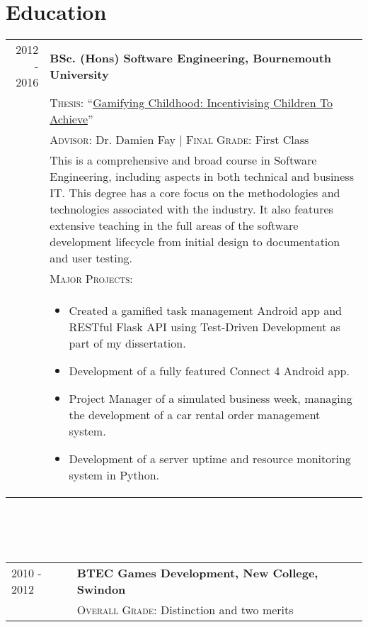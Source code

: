 \section{Education}
\begin{tabular}{r|p{11cm}}
	2012 - 2016 & \textbf{BSc. (Hons) Software Engineering, Bournemouth University}\\ 
	& \textsc{Thesis}: ``\href{https://github.com/mikeporterdev/Dissertation/blob/master/digitalmain.pdf}{Gamifying Childhood: Incentivising Children To Achieve}'' \\
	& \textsc{Advisor}: Dr. Damien Fay | \normalsize \textsc{Final Grade}: First Class \\
	& \footnotesize This is a comprehensive and broad course in Software Engineering, including aspects in both technical and business IT. This degree has a core focus on the methodologies and technologies associated with the industry. It also features extensive teaching in the full areas of the software development lifecycle from initial design to documentation and user testing. \\
	& \vspace{1pt} \textsc{Major Projects}: \\
	& \vspace{-0.9em}\begin{itemize}[itemsep=0pt,topsep=0pt,leftmargin=*]\footnotesize
	\item Created a gamified task management Android app and RESTful Flask API using Test-Driven Development as part of my dissertation.
	\item Development of a fully featured Connect 4 Android app. 
	\item Project Manager of a simulated business week, managing the development of a car rental order management system.
	\item Development of a server uptime and resource monitoring system in Python.
	\end{itemize}\vspace{-1.5em}

\end{tabular} \\ \\ \\
\begin{tabular}{p{46pt}|p{11cm}}
	\hspace*{\fill}2010 - 2012 & \textbf{BTEC Games Development, New College, Swindon}\\
	\ & \textsc{Overall Grade}: Distinction and two merits
\end{tabular}

